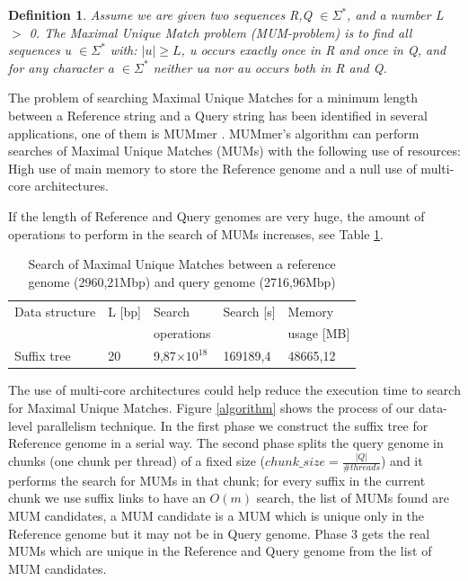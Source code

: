 \documentclass[conference]{IEEEtran}
\newtheorem{mydef}{Definition}
\providecommand{\e}[1]{\ensuremath{\times 10^{#1}}}
\begin{document}
\begin{mydef}
\label{problem}
Assume we are given two sequences R,Q $\in \Sigma^*$, and a number L $>$ 0. The Maximal Unique Match problem (MUM-problem) is to find all sequences u $\in \Sigma^*$ with: $|u|\geq L$, u occurs exactly once in R and once in Q, and for any character a $\in \Sigma^*$ neither ua nor au occurs both in R and Q.
\end{mydef}

The problem of searching Maximal Unique Matches for a minimum length between a Reference
string and a Query string has been identified in several applications, one of them is MUMmer \cite{Delcher2003}. MUMmer's algorithm can perform searches of Maximal Unique Matches (MUMs)
with the following use of resources: High use of main memory to store the Reference genome and a null use of multi-core architectures.

If the length of Reference and Query genomes are very huge, the amount of operations to perform in the search of MUMs increases, see Table \ref{tbl:operations}.
\begin{table}[htb]
  \begin{small}
    \begin{center}
      \begin{tabular}{lllll}
        Data structure & L [bp] & Search  & Search [s] & Memory\\
        & & operations & & usage [MB]\\
        \hline
        Suffix tree & 20 & 9,87\e{18}  & 169189,4 & 48665,12\\
        \hline
      \end{tabular}
    \end{center}
  \end{small}
  \caption{Search of Maximal Unique Matches between a reference genome (2960,21Mbp) and query genome (2716,96Mbp)}
  \label{tbl:operations}
\end{table}

The use of multi-core architectures could help reduce the execution time to search for Maximal Unique Matches. Figure \ref{algorithm} shows the process of our data-level parallelism technique. In the first phase we construct the suffix tree for Reference genome in a serial way. The second phase splits the query genome in chunks (one chunk per thread) of a fixed size ($chunk\_size=\frac{|Q|}{\#threads}$)  and it performs the search for MUMs in that chunk; for every suffix in the current chunk we use suffix links to have an $O(m)$ search, the list of MUMs found are MUM candidates, a MUM candidate is a MUM which is unique only in the Reference genome but it may not be in Query genome. Phase 3 gets the real MUMs which are unique in the Reference and Query genome from the list of MUM candidates.
\end{document}
